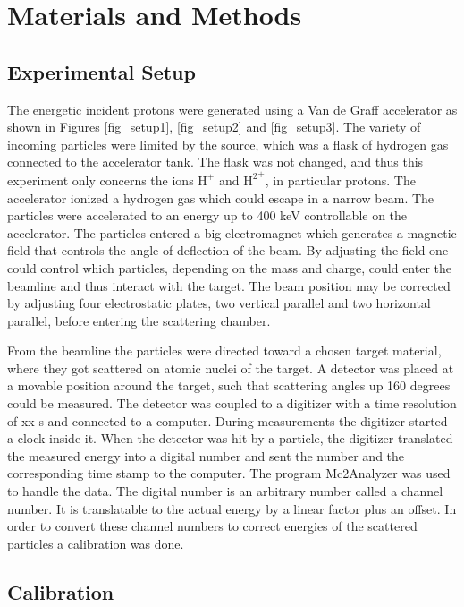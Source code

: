 \section{Materials and Methods}
\subsection{Experimental Setup}
The energetic incident protons were generated using a Van de Graff accelerator as shown in Figures \ref{fig_setup1}, \ref{fig_setup2} and \ref{fig_setup3}. The variety of incoming particles were limited by the source, which was a flask of hydrogen gas connected to the accelerator tank. The flask was not changed, and thus this experiment only concerns the ions $\mathrm{H^+}$ and $\mathrm{{H^2}^+}$, in particular protons. The accelerator ionized a hydrogen gas which could escape in a narrow beam. The particles were accelerated to an energy up to 400 keV controllable on the accelerator. The particles entered a big electromagnet which generates a magnetic field that controls the angle of deflection of the beam. By adjusting the field one could control which particles, depending on the mass and charge, could enter the beamline and thus interact with the target. 
The beam position may be corrected by adjusting four electrostatic plates, two vertical parallel and two horizontal parallel, before entering the scattering chamber.

From the beamline the particles were directed toward a chosen target material, where they got scattered on atomic nuclei of the target. A detector was placed at a movable position around the target, such that scattering angles up 160 degrees could be measured. 
The detector was coupled to a digitizer with a time resolution of xx s and  connected to a computer. During measurements the digitizer started a clock inside it. When the detector was hit by a particle, the digitizer translated the measured energy into a digital number and sent the number and the corresponding time stamp to the computer. 
The program Mc2Analyzer was used to handle the data. The digital number is an arbitrary number called a channel number. It is translatable to the actual energy by a linear factor plus an offset. In order to convert these channel numbers to correct energies of the scattered particles a calibration was done.

\subsection{Calibration}

